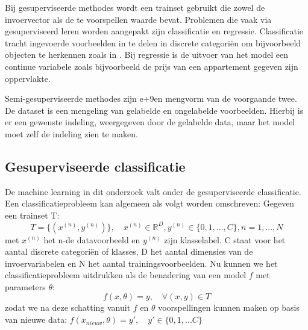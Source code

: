 \npar Bij gesuperviseerde methodes wordt een trainset gebruikt die zowel de invoervector als de te voorspellen waarde bevat. Problemen die vaak via gesuperviseerd leren worden aangepakt zijn classificatie en regressie. Classificatie tracht ingevoerde voorbeelden in te delen in discrete categori\"en om bijvoorbeeld objecten te herkennen zoals in \cite{cnn-krizhevsky}. Bij regressie is de uitvoer van het model een continue variabele zoals bijvoorbeeld de prijs van een appartement gegeven zijn oppervlakte.

\npar Semi-gesuperviseerde methodes zijn e+9en mengvorm van de voorgaande twee. De dataset is een mengeling van gelabelde en ongelabelde voorbeelden. Hierbij is er een gewenste indeling, weergegeven door de gelabelde data, maar het model moet zelf de indeling zien te maken.


\subsection{Gesuperviseerde classificatie}

\npar De machine learning in dit onderzoek valt onder de gesuperviseerde classificatie. Een classificatieprobleem kan algemeen als volgt worden omschreven:
\npar Gegeven een trainset T:
\begin{equation}
T = \{ ( x^{(n)}, y^{(n)})\},\quad x^{(n)}\in\mathbb{R}^D, y^{(n)}\in\{0,1,...,C\}, n=1,...,N
\end{equation}
met $x^{(n)}$ het n-de datavoorbeeld en $y^{(n)}$ zijn klasselabel. C staat voor het aantal discrete categori\"en of klasses, D het aantal dimensies van de invoervariabelen en N het aantal trainingsvoorbeelden. Nu kunnen we het classificatieprobleem uitdrukken als de benadering van een model $f$ met parameters $\theta$:
\begin{equation}\label{eq:classifier}
f(x,\theta) = y,\quad\forall(x,y) \in T
\end{equation}
zodat we na deze schatting vanuit $f$ en $\theta$ voorspellingen kunnen maken op basis van nieuwe data: $f(x_{nieuw},\theta)=y', \quad y' \in\{0,1,...C\}$

